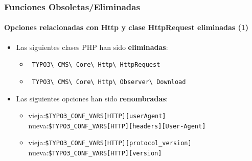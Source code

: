 \begin{frame}[fragile]
	\frametitle{Funciones Obsoletas/Eliminadas}
	\framesubtitle{Opciones relacionadas con Http y clase HttpRequest eliminadas (1)}

	\begin{itemize}

		\item Las siguientes clases PHP han sido \textbf{eliminadas}:

			\begin{itemize}
				\item \small\texttt{
					TYPO3\textbackslash
					CMS\textbackslash
					Core\textbackslash
					Http\textbackslash
					HttpRequest}\normalsize
				\item \small\texttt{
					TYPO3\textbackslash
					CMS\textbackslash
					Core\textbackslash
					Http\textbackslash
					Observer\textbackslash
					Download}\normalsize
			\end{itemize}

		\item Las siguientes opciones han sido \textbf{renombradas}:

			\begin{itemize}

				\item
					\small
						vieja:\tabto{1cm}\texttt{\$TYPO3\_CONF\_VARS[HTTP][userAgent]}\newline
						nueva:\tabto{1cm}\texttt{\$TYPO3\_CONF\_VARS[HTTP][headers][User-Agent]}

				\item
					\small
						vieja:\tabto{1cm}\texttt{\$TYPO3\_CONF\_VARS[HTTP][protocol\_version]}\newline
						nueva:\tabto{1cm}\texttt{\$TYPO3\_CONF\_VARS[HTTP][version]}

			\end{itemize}

	\end{itemize}

\end{frame}


